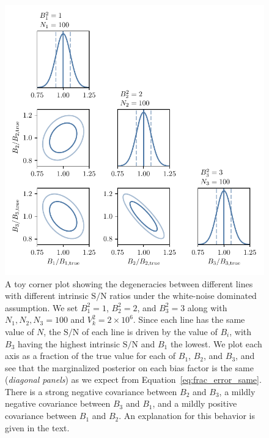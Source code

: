\documentclass{aastex62}
\newcommand{\SN}{\ensuremath{\text{S}/\text{N}}}
\begin{document}
\begin{figure}[h!]
\begin{center}
\includegraphics{fig/corner_Nconstant.pdf}
\end{center}
\caption{A toy corner plot showing the degeneracies between different lines
with different intrinsic \SN{} ratios under the white-noise dominated
assumption. We set $B_1^2 = 1$, $B_2^2 = 2$, and $B_3^2 = 3$ along with $N_1,
N_2, N_3 = 100$ and $V_k^2 = 2\times10^6$. Since each line has the same value
of $N$, the \SN{} of each line is driven by the value of $B_i$, with $B_3$
having the highest intrinsic \SN{} and $B_1$ the lowest. We plot each axis as
a fraction of the true value for each of $B_1$, $B_2$, and $B_3$, and see that
the marginalized posterior on each bias factor is the same (\textit{diagonal
panels}) as we expect from Equation~\ref{eq:frac_error_same}. There is a
strong negative covariance between $B_2$ and $B_3$, a mildly negative
covariance between $B_3$ and $B_1$, and a mildly positive covariance between
$B_1$ and $B_2$. An explanation for this behavior is given in the text.}
\label{fig:tf_Nconst}
\end{figure}
\end{document}
